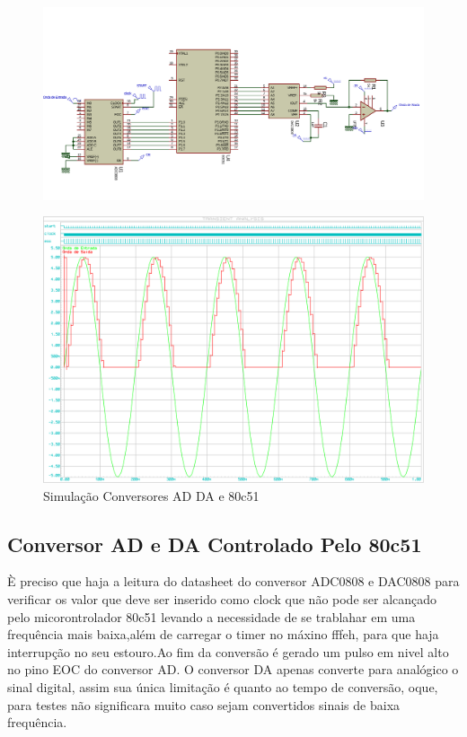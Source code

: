 \documentclass{Fabiano_file}
\begin{document}
{	\newpage
	\clearpage
	\begin{figure}
		\centering
		\includegraphics[width=1\linewidth]{adc_dac_ideal}
		\label{fig:adc_dac_ideal}
	\end{figure}
	\newpage

\begin{figure}[h!]
\centering
\includegraphics[width=1\textwidth]{adc_8051_dac_ideal.pdf}
\caption{Simulação Conversores AD DA e 80c51}
\label{fig:adc_8051_dac_ideal}
\end{figure}

\newpage

\subsection{Conversor AD e DA Controlado Pelo 80c51}
È preciso que haja a leitura do datasheet do conversor ADC0808 e DAC0808 para verificar os valor que deve ser inserido como clock que 
não pode ser alcançado pelo micorontrolador 80c51 levando a necessidade de se trablahar em uma frequência mais baixa,além de carregar o 
timer no máxino fffeh, para que haja interrupção no seu estouro.Ao fim da conversão é gerado um pulso em nivel alto no pino EOC do conversor AD.
O conversor DA apenas converte para analógico o sinal digital, assim sua única limitação é quanto ao tempo de conversão, oque, para testes 
não significara muito caso sejam convertidos sinais de baixa frequência.\\

}
\end{document}
